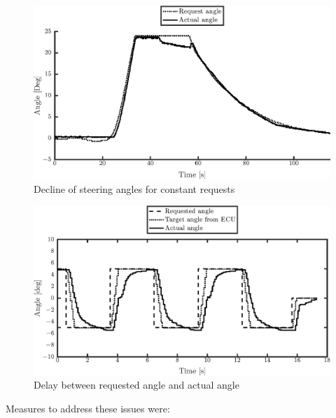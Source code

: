 \documentclass[root.tex]{subfiles}
\begin{document}
	\begin{figure}[!h]
		
		\includegraphics[width=1\linewidth]{front}
		\caption[Decline of steering angles for constant requests]{Decline of steering angles for constant requests}
		
		\label{fig:Constant_request}
	\end{figure}
	\begin{figure}[!h]
		
		\includegraphics[width=1\linewidth]{Step_input_request}
		\caption[Delay between requested and actual angle]{Delay between requested angle and actual angle}
		
		\label{fig:Step_input_request}
	\end{figure}
	
	Measures to address these issues were:
	
\end{document}
